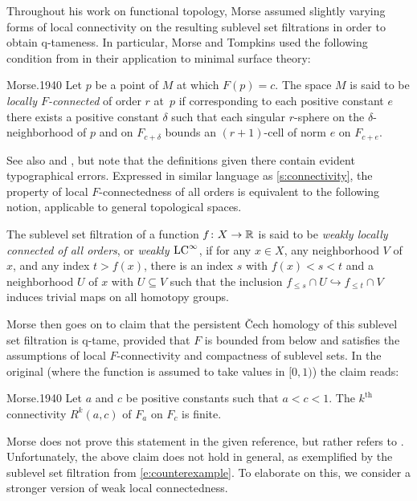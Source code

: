 Throughout his work on functional topology, Morse assumed slightly varying forms of local connectivity on the resulting sublevel set filtrations in order to obtain \mbox{q-tameness}.
In particular, Morse and Tompkins used the following condition from \cite{Morse.1938,Morse.1940} in their application to minimal surface theory:
\begin{displaycquote}[p.~431]{Morse.1940}
	Let $p$ be a point of $M$ at which $F(p)=c$.
	The space $M$ is said to be \emph{locally $F$-connected} of order $r$ at~$p$ if corresponding to each positive constant $e$ there exists a positive constant $\delta$ such that each singular $r$-sphere on the $\delta$-neighborhood of $p$ and on $F_{c+\delta}$ bounds an $(r+1)$-cell of norm $e$ on $F_{c+e}$.
\end{displaycquote}
See also \cite[p.~ 25]{Morse.1938} and \cite[p.~464]{Morse.1939}, but note that the definitions given there contain evident typographical errors.
Expressed in similar language as \cref{s:connectivity}, the property of local $F$-connectedness of all orders is equivalent to the following notion, applicable to general topological spaces.

\begin{defi}
	The sublevel set filtration of a function $f \colon X \to \mathbb{R}$ is said to be \emph{weakly locally connected of all orders}, or \emph{weakly $\mathrm{LC}^\infty$}, if for any $x \in X$, any neighborhood $V$ of $x$, and any index $t > f(x)$, there is an index $s$ with $f(x) < s < t$ and a neighborhood $U$ of $x$ with $U \subseteq V$ such that the inclusion $f_{\leq s} \cap U \hookrightarrow f_{\leq t} \cap V$ induces trivial maps on all homotopy groups.
\end{defi}

Morse then goes on to claim that the persistent \v{C}ech homology of this sublevel set filtration is q-tame, provided that $F$ is bounded from below and satisfies the assumptions of local $F$-connectivity and compactness of sublevel sets.
In the original (where the function is assumed to take values in $[0,1)$) the claim reads:
\begin{displaycquote}[Theorem 6.3, p.~432]{Morse.1940}
	Let $a$ and $c$ be positive constants such that $a < c < 1$.
	The $k^{\mathrm{th}}$ connectivity $R^k(a,c)$ of $F_a$ on $F_c$ is finite.
\end{displaycquote}
Morse does not prove this statement in the given reference, but rather refers to \cite[Theorem~6.1]{Morse.1938}.
Unfortunately, the above claim does not hold in general, as exemplified by the sublevel set filtration from \cref{e:counterexample}.
To elaborate on this, we consider a stronger version of weak local connectedness.

